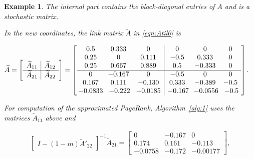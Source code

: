 \documentclass[11pt,draftcls,onecolumn]{IEEEtran}
\newtheorem{example}[theorem]{Example}
\begin{document}
\begin{example}
\vspace*{-2mm}
\noindent
The internal part contains the block-diagonal entries of $A$
and is a stochastic matrix. 

In the new coordinates, 
the link matrix $\widetilde{A}$ in \eqref{eqn:Atil0} is

\vspace*{-2mm}
{\small
\begin{align*}
  & \widetilde{A}
     = \left[
         \begin{array}{c|c}
          \widetilde{A}_{11} & \widetilde{A}_{12}\\
          \hline
          \widetilde{A}_{21} & \widetilde{A}_{22}
         \end{array}
       \right]
   = \left[
         \begin{array}{ccc|ccc}
           0.5  & 0.333 & 0     &  0   &  0     & 0\\
           0.25 & 0     & 0.111 & -0.5 &  0.333 & 0\\
           0.25 & 0.667 & 0.889 &  0.5 & -0.333 & 0\\
           \hline
           0   & -0.167 &      0 &  -0.5  &        0  &       0\\
           0.167 &  0.111 & -0.130 &   0.333 &   -0.389 &   -0.5\\   
          \hspace*{-1mm}-0.0833 \hspace*{-1mm}&  -0.222 \hspace*{-1mm}&  -0.0185 
                & -0.167\hspace*{-1mm} &   -0.0556\hspace*{-1mm} &   -0.5\hspace*{-1mm}
	     \end{array}
	  \right].
\end{align*}}

\vspace*{-2mm}
\noindent
For computation of the approximated PageRank, 
Algorithm~\ref{alg:1} uses the matrices $\widetilde{A}_{11}$ above and

\vspace*{-2mm}
{\small
\begin{align*}
  \begin{bmatrix}
    I - (1-m)\widetilde{A}'_{22}
  \end{bmatrix}^{-1}
    \widetilde{A}_{21}
     = \begin{bmatrix}
         0 & -0.167 & 0\\
         0.174 & 0.161 & -0.113\\
         -0.0758 & -0.172 & -0.00177
       \end{bmatrix},
\end{align*}}


\end{example}
\end{document}
